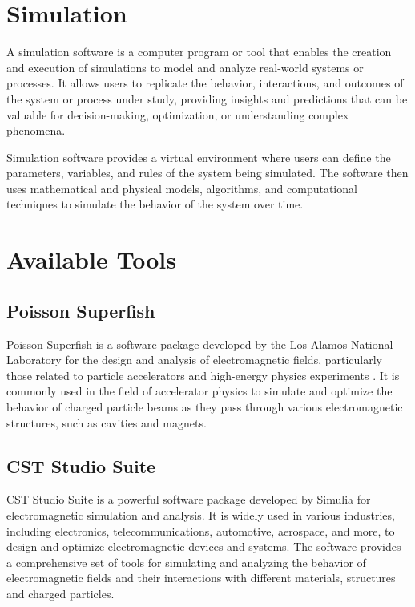 \documentclass[a4paper,oneside,12pt]{report}
\numberwithin{equation}{chapter}
\begin{document}
\section{Simulation}
A simulation software is a computer program or tool that enables the creation and execution of 
simulations to model and analyze real-world systems or processes. 
It allows users to replicate the behavior, interactions, and outcomes of the system or process under study, 
providing insights and predictions that can be valuable for decision-making, optimization, or understanding complex phenomena.

Simulation software provides a virtual environment where users can define the parameters,
variables, and rules of the system being simulated. The software then uses mathematical and physical models, 
algorithms, and computational techniques to simulate the behavior of the system over time.



\section{Available Tools}

\subsection{Poisson Superfish}
Poisson Superfish is a software package developed by the Los Alamos National Laboratory 
for the design and analysis of electromagnetic fields, particularly those related to particle accelerators and high-energy physics experiments \cite{poi-sup}.
It is commonly used in the field of accelerator physics to simulate and optimize the behavior of charged particle beams as they pass through various electromagnetic structures, such as cavities and magnets.


\subsection{CST Studio Suite}
CST Studio Suite is a powerful software package developed by Simulia for electromagnetic simulation and analysis. It is widely used in various industries, including electronics, telecommunications, automotive, aerospace, and more, to design and optimize electromagnetic devices and systems. 
The software provides a comprehensive set of tools for simulating and analyzing the behavior of electromagnetic fields and their interactions with different materials, structures and charged particles.
\end{document}
